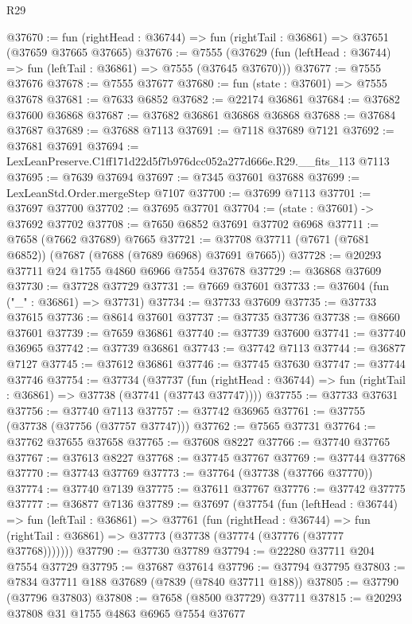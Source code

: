 \begin{lexlean}{R29}
\begin{coremodule}
@37670 := fun (rightHead : @36744) => fun (rightTail : @36861) => @37651 (@37659 @37665 @37665)
@37676 := @7555
    (@37629 (fun (leftHead : @36744) => fun (leftTail : @36861) => @7555 (@37645 @37670)))
@37677 := @7555 @37676
@37678 := @7555 @37677
@37680 := fun (state : @37601) => @7555 @37678
@37681 := @7633 @6852
@37682 := @22174 @36861
@37684 := @37682 @37600 @36868
@37687 := @37682 @36861 @36868 @36868
@37688 := @37684 @37687
@37689 := @37688 @7113
@37691 := @7118 @37689 @7121
@37692 := @37681 @37691
@37694 := LexLeanPreserve.C1ff171d22d5f7b976dcc052a277d666e.R29.__fits_113 @7113
@37695 := @7639 @37694
@37697 := @7345 @37601 @37688
@37699 := LexLeanStd.Order.mergeStep @7107
@37700 := @37699 @7113
@37701 := @37697 @37700
@37702 := @37695 @37701
@37704 := (state : @37601) -> @37692 @37702
@37708 := @7650 @6852 @37691 @37702 @6968
@37711 := @7658 (@7662 @37689) @7665
@37721 := @37708 @37711 (@7671 (@7681 @6852)) (@7687 (@7688 (@7689 @6968) @37691 @7665))
@37728 := @20293 @37711 @24 @1755 @4860 @6966 @7554 @37678
@37729 := @36868 @37609
@37730 := @37728 @37729
@37731 := @7669 @37601
@37733 := @37604 (fun ("_" : @36861) => @37731)
@37734 := @37733 @37609
@37735 := @37733 @37615
@37736 := @8614 @37601
@37737 := @37735 @37736
@37738 := @8660 @37601
@37739 := @7659 @36861
@37740 := @37739 @37600
@37741 := @37740 @36965
@37742 := @37739 @36861
@37743 := @37742 @7113
@37744 := @36877 @7127
@37745 := @37612 @36861
@37746 := @37745 @37630
@37747 := @37744 @37746
@37754 := @37734
    (@37737
      (fun (rightHead : @36744) => fun (rightTail : @36861) => @37738 (@37741 (@37743 @37747))))
@37755 := @37733 @37631
@37756 := @37740 @7113
@37757 := @37742 @36965
@37761 := @37755 (@37738 (@37756 (@37757 @37747)))
@37762 := @7565 @37731
@37764 := @37762 @37655 @37658
@37765 := @37608 @8227
@37766 := @37740 @37765
@37767 := @37613 @8227
@37768 := @37745 @37767
@37769 := @37744 @37768
@37770 := @37743 @37769
@37773 := @37764 (@37738 (@37766 @37770))
@37774 := @37740 @7139
@37775 := @37611 @37767
@37776 := @37742 @37775
@37777 := @36877 @7136
@37789 := @37697
    (@37754
      (fun (leftHead : @36744) =>
      fun (leftTail : @36861) =>
      @37761
        (fun (rightHead : @36744) =>
        fun (rightTail : @36861) => @37773 (@37738 (@37774 (@37776 (@37777 @37768)))))))
@37790 := @37730 @37789
@37794 := @22280 @37711 @204 @7554 @37729
@37795 := @37687 @37614
@37796 := @37794 @37795
@37803 := @7834 @37711 @188 @37689 (@7839 (@7840 @37711 @188))
@37805 := @37790 (@37796 @37803)
@37808 := @7658 (@8500 @37729) @37711
@37815 := @20293 @37808 @31 @1755 @4863 @6965 @7554 @37677

\end{coremodule}
\end{lexlean}
